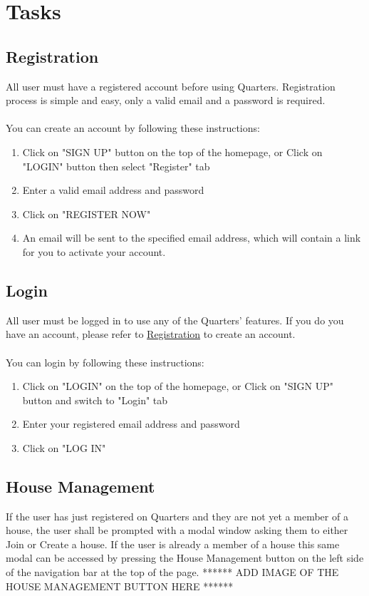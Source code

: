 \documentclass[12pt]{article}
\begin{document}
    \section{Tasks}
    
    \subsection{Registration}
    \label{sec:registration}
    All user must have a registered account before using Quarters. Registration process is simple and easy, only a valid email and a password is required.\\\\
    You can create an account by following these instructions:
    
    \begin{enumerate}
        \item Click on "SIGN UP" button on the top of the homepage, or Click on "LOGIN" button then select "Register" tab
        \item Enter a valid email address and password
        \item Click on "REGISTER NOW"
        \item An email will be sent to the specified email address, which will contain a link for you to activate your account.
    \end{enumerate}
    \subsection{Login}
    All user must be logged in to use any of the Quarters' features. If you do you have an account, please refer to \hyperref[sec:registration]{Registration} to create an account. \\ \\
    You can login by following these instructions:
    \begin{enumerate}
        \item Click on "LOGIN" on the top of the homepage, or Click on "SIGN UP" button and switch to "Login" tab
        \item Enter your registered email address and password
        \item Click on "LOG IN"
    \end{enumerate}
    \subsection{House Management} %
    If the user has just registered on Quarters and they are not yet a member of a house, the user shall be prompted with a modal window asking them to either Join or Create a house. If the user is already a member of a house this same modal can be accessed by pressing the House Management button on the  left side of the navigation bar at the top of the page. ****** ADD IMAGE OF THE HOUSE MANAGEMENT BUTTON HERE ******
    
\end{document}
